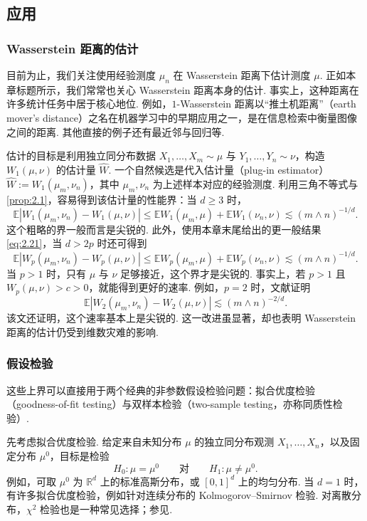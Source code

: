 \subsection{应用}\label{sec:2.5}
\subsubsection{Wasserstein 距离的估计}\label{sec:2.5.1}
目前为止，我们关注使用经验测度 $\mu_n$ 在 Wasserstein 距离下估计测度 $\mu$. 正如本章标题所示，我们常常也关心 Wasserstein 距离本身的估计. 事实上，这种距离在许多统计任务中居于核心地位. 例如，$1$-Wasserstein 距离以“推土机距离”（earth mover's distance）之名在机器学习中的早期应用之一，是在信息检索中衡量图像之间的距离\cite{ref276}. 其他直接的例子还有最近邻\cite{ref29,ref261}与回归\cite{ref72,ref145}等.

估计的目标是利用独立同分布数据 $X_1,\ldots,X_m\sim\mu$ 与 $Y_1,\ldots,Y_n\sim\nu$，构造 $W_1(\mu,\nu)$ 的估计量 $\widehat W$. 一个自然候选是代入估计量（plug-in estimator）$\widehat W:=W_1(\mu_m,\nu_n)$，其中 $\mu_m,\nu_n$ 为上述样本对应的经验测度. 利用三角不等式与\autoref{prop:2.1}，容易得到该估计量的性能界：当 $d\ge3$ 时，
$$\mathbb E|W_1(\mu_m,\nu_n)-W_1(\mu,\nu)|
\le\mathbb EW_1(\mu_m,\mu)+\mathbb EW_1(\nu_n,\nu)\lesssim(m\wedge n)^{-1/d}.$$
这个粗略的界一般而言是尖锐的. 此外，使用本章末尾给出的更一般结果 \eqref{eq:2.21}，当 $d>2p$ 时还可得到
$$\mathbb E|W_p(\mu_m,\nu_n)-W_p(\mu,\nu)|
\le\mathbb EW_p(\mu_m,\mu)+\mathbb EW_p(\nu_n,\nu)\lesssim(m\wedge n)^{-1/d}.$$
当 $p>1$ 时，只有 $\mu$ 与 $\nu$ 足够接近，这个界才是尖锐的. 事实上，若 $p>1$ 且 $W_p(\mu,\nu)>c>0$，就能得到更好的速率. 例如，$p=2$ 时，文献\cite{ref220}证明
$$\mathbb E|W_2(\mu_m,\nu_n)-W_2(\mu,\nu)|\lesssim(m\wedge n)^{-2/d}.$$
该文还证明，这个速率基本上是尖锐的. 这一改进虽显著，却也表明 Wasserstein 距离的估计仍受到维数灾难的影响.

\subsubsection{假设检验}\label{sec:2.5.2}
这些上界可以直接用于两个经典的非参数假设检验问题：拟合优度检验（goodness-of-fit testing）与双样本检验（two-sample testing，亦称同质性检验）.

先考虑拟合优度检验. 给定来自未知分布 $\mu$ 的独立同分布观测 $X_1,\ldots,X_n$，以及固定分布 $\mu^0$，目标是检验
$$H_0:\mu=\mu^0\qquad\text{对}\qquad H_1:\mu\ne\mu^0.$$
例如，可取 $\mu^0$ 为 $\mathbb R^d$ 上的标准高斯分布，或 $[0,1]^d$ 上的均匀分布. 当 $d=1$ 时，有许多拟合优度检验，例如针对连续分布的 Kolmogorov--Smirnov 检验. 对离散分布，$\chi^2$ 检验也是一种常见选择；参见\cite[第14章]{ref205}.

